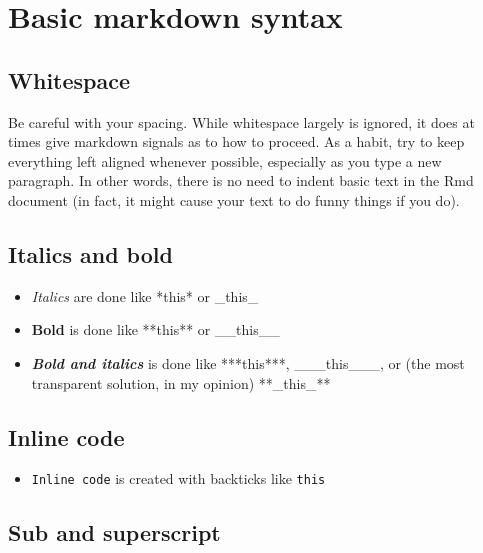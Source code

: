 \documentclass[a4paper, twoside]{templates/ociamthesis}
\providecommand{\tightlist}{%
  \setlength{\itemsep}{0pt}\setlength{\parskip}{0pt}}
\theoremstyle{definition}
\theoremstyle{definition}
\theoremstyle{definition}
\theoremstyle{definition}
\theoremstyle{remark}
\begin{document}
\hypertarget{basic-markdown-syntax}{%
\section{Basic markdown syntax}\label{basic-markdown-syntax}}

\hypertarget{whitespace}{%
\subsection{Whitespace}\label{whitespace}}

Be careful with your spacing.
While whitespace largely is ignored, it does at times give markdown signals as to how to proceed.
As a habit, try to keep everything left aligned whenever possible, especially as you type a new paragraph.
In other words, there is no need to indent basic text in the Rmd document (in fact, it might cause your text to do funny things if you do).

\hypertarget{italics-and-bold}{%
\subsection{Italics and bold}\label{italics-and-bold}}

\begin{itemize}
\tightlist
\item
  \emph{Italics} are done like *this* or \_this\_
\item
  \textbf{Bold} is done like **this** or \_\_this\_\_
\item
  \textbf{\emph{Bold and italics}} is done like ***this***, \_\_\_this\_\_\_, or (the most transparent solution, in my opinion) **\_this\_**
\end{itemize}

\hypertarget{inline-code}{%
\subsection{Inline code}\label{inline-code}}

\begin{itemize}
\tightlist
\item
  \texttt{Inline\ code} is created with backticks like \texttt{\textasciigrave{}this\textasciigrave{}}
\end{itemize}

\hypertarget{sub-and-superscript}{%
\subsection{Sub and superscript}\label{sub-and-superscript}}
\end{document}
